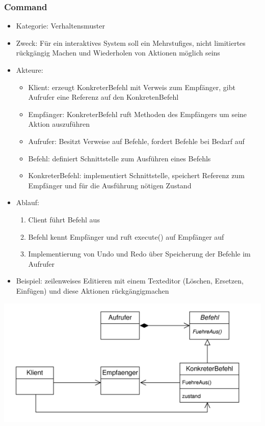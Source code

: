 \documentclass[11pt, fleqn, a4paper, leqno]{scrartcl} %
\begin{document}
		\subsubsection{Command}
			\begin{itemize}
				\item Kategorie: Verhaltensmuster
				\item Zweck: Für ein interaktives System soll ein Mehrstufiges, nicht limitiertes rückgängig Machen und Wiederholen von Aktionen möglich seins
				\item Akteure: 
					\begin{itemize}
						\item Klient: erzeugt KonkreterBefehl mit Verweis zum Empfänger, gibt Aufrufer eine Referenz auf den KonkretenBefehl
						\item Empfänger: KonkreterBefehl ruft Methoden des Empfängers um seine Aktion auszuführen
						\item Aufrufer: Besitzt Verweise auf Befehle, fordert Befehle  bei Bedarf auf
						\item Befehl: definiert Schnittstelle zum Ausführen eines Befehls
						\item KonkreterBefehl: implementiert Schnittstelle, speichert Referenz zum Empfänger und für die Ausführung nötigen Zustand
					\end{itemize}
				\item Ablauf:
					\begin{enumerate}
						\item Client führt Befehl aus
						\item Befehl kennt Empfänger und ruft execute() auf Empfänger auf
						\item Implementierung von Undo und Redo über Speicherung der Befehle im Aufrufer
					\end{enumerate}
				\item Beispiel: zeilenweises Editieren mit einem Texteditor (Löschen, Ersetzen, Einfügen) und diese Aktionen rückgängigmachen
			\end{itemize}
			\includegraphics[scale=0.8]{images/commando.png}
			\newpage
\end{document}
